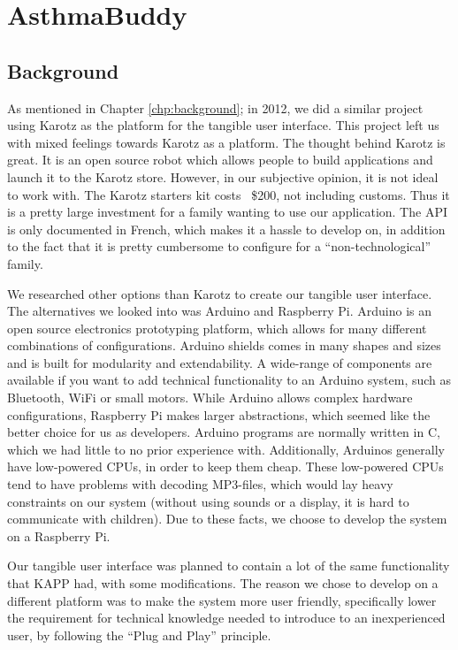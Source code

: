 
\chapter{AsthmaBuddy}
\label{chp:our-solution}

\section{Background}
As mentioned in Chapter \ref{chp:background}; in 2012, we did a similar project using Karotz as the platform for the tangible user interface\cite{CustomerDriven}.
This project left us with mixed feelings towards Karotz as a platform. The thought behind Karotz is great. It is an open source robot which allows people to build applications and launch it to the Karotz store. However, in our subjective opinion, it is not ideal to work with. The Karotz starters kit costs ~\$200, not including customs. Thus it is a pretty large investment for a family wanting to use our application. The API is only documented in French, which makes it a hassle to develop on, in addition to the fact that it is pretty cumbersome to configure for a ``non-technological'' family. 

We researched other options than Karotz to create our tangible user interface. The alternatives we looked into was Arduino and Raspberry Pi. Arduino is an open source electronics prototyping platform\cite{arduino}, which allows for many different combinations of configurations. Arduino shields comes in many shapes and sizes and is built for modularity and extendability. A wide-range of components are available if you want to add technical functionality to an Arduino system, such as Bluetooth, WiFi or small motors. 
While Arduino allows complex hardware configurations, Raspberry Pi makes larger abstractions, which seemed like the better choice for us as developers. Arduino programs are normally written in C\cite{strahl2000language}, which we had little to no prior experience with. Additionally, Arduinos generally have low-powered CPUs, in order to keep them cheap. These low-powered CPUs tend to have problems with decoding MP3-files, which would lay heavy constraints on our system (without using sounds or a display, it is hard to communicate with children). Due to these facts, we choose to develop the system on a Raspberry Pi.

Our tangible user interface was planned to contain a lot of the same functionality that KAPP had, with some modifications. The reason we chose to develop on a different platform was to make the system more user friendly, specifically lower the requirement for technical knowledge needed to introduce \ab{} to an inexperienced user, by following the ``Plug and Play'' principle.
 
